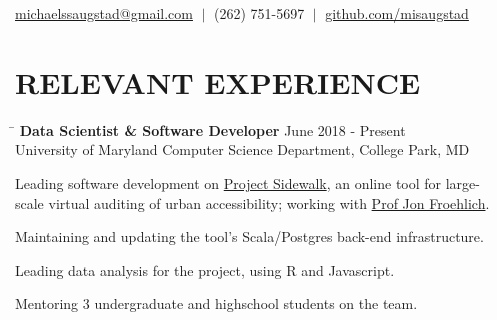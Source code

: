 \documentclass{res}
\newcommand{\vb}{\; | \;}
\begin{document}
 
                                  
\begin{resume}
\vspace{-5pt}
{\large %
  \begin{center}
    \href{mailto:michaelssaugstad@gmail.com}{michaelssaugstad@gmail.com} $\vb$
    (262) 751-5697 $\vb$
    \href{https://github.com/misaugstad}
         {github.com/misaugstad}
  \end{center}

  \vspace{-2pt}
  \section{\hspace{0.3in}RELEVANT EXPERIENCE}
    \vspace{-3pt}
    \begin{tabbing}
      \hspace{5.65in}\=  \kill %
      {\bf Data Scientist \& Software Developer}
      \>June 2018 - Present\\
      University of Maryland Computer Science Department, College Park, MD\\     
    \end{tabbing}
    \vspace{-24pt}      %
    \begin{list}{\bf{-}}{}
      \setlength{\itemsep}{-2pt}
      \item Leading software development on
            \href{http://sidewalk.umiacs.umd.edu/}{Project Sidewalk}, an online tool for large-\\
            scale virtual auditing of urban accessibility; working with
            \href{http://www.cs.umd.edu/~jonf/}{Prof Jon Froehlich}.
      \item Maintaining and updating the tool's Scala/Postgres back-end infrastructure.
      \item Leading data analysis for the project, using R and Javascript.
      \item Mentoring 3 undergraduate and highschool students on the team.
    \end{list}

}
\end{resume}
\end{document}
